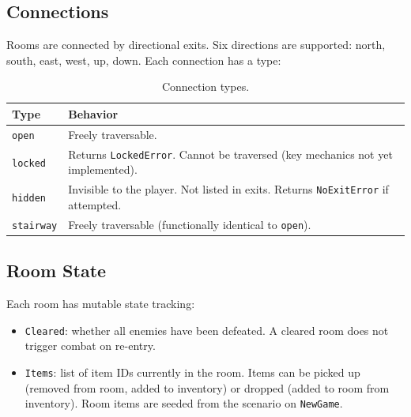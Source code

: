 \documentclass[a4paper,10pt]{article}
\newcommand{\field}[1]{\texttt{#1}}
\begin{document}
\subsection{Connections}

Rooms are connected by directional exits. Six directions are supported:
north, south, east, west, up, down. Each connection has a type:

\begin{table}[h]
\centering
\begin{tabular}{@{}lp{8cm}@{}}
\toprule
\textbf{Type} & \textbf{Behavior} \\
\midrule
\texttt{open}     & Freely traversable. \\
\texttt{locked}   & Returns \texttt{LockedError}. Cannot be traversed (key mechanics not yet implemented). \\
\texttt{hidden}   & Invisible to the player. Not listed in exits. Returns \texttt{NoExitError} if attempted. \\
\texttt{stairway} & Freely traversable (functionally identical to \texttt{open}). \\
\bottomrule
\end{tabular}
\caption{Connection types.}
\end{table}

\subsection{Room State}

Each room has mutable state tracking:

\begin{itemize}[nosep]
  \item \field{Cleared}: whether all enemies have been defeated.
        A cleared room does not trigger combat on re-entry.
  \item \field{Items}: list of item IDs currently in the room. Items can
        be picked up (removed from room, added to inventory) or dropped
        (added to room from inventory). Room items are seeded from the
        scenario on \texttt{NewGame}.
\end{itemize}

\end{document}

